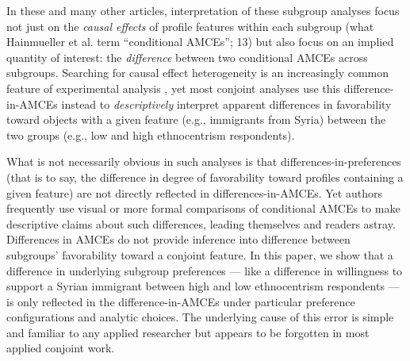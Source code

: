 \documentclass[a4paper,12pt]{article}\usepackage[]{graphicx}\usepackage[]{color}
\begin{document}
In these and many other articles, interpretation of these subgroup analyses focus not just on the \textit{causal effects} of profile features within each subgroup (what Hainmueller et al. term ``conditional AMCEs''; 13) but also focus on an implied quantity of interest: the \textit{difference} between two conditional AMCEs across subgroups. Searching for causal effect heterogeneity is an increasingly common feature of experimental analysis \citep{GreenKern2012, RatkovicTingley2017, GrimmerMessingWestwood2017}, yet most conjoint analyses use this difference-in-AMCEs instead to \textit{descriptively} interpret apparent differences in favorability toward objects with a given feature (e.g., immigrants from Syria) between the two groups (e.g., low and high ethnocentrism respondents).

What is not necessarily obvious in such analyses is that differences-in-preferences (that is to say, the difference in degree of favorability toward profiles containing a given feature) are not directly reflected in differences-in-AMCEs. Yet authors frequently use visual or more formal comparisons of conditional AMCEs to make descriptive claims about such differences, leading themselves and readers astray. Differences in AMCEs do not provide inference into difference between subgroups' favorability toward a conjoint feature. In this paper, we show that a difference in underlying subgroup preferences --- like a difference in willingness to support a Syrian immigrant between high and low ethnocentrism respondents --- is only reflected in the difference-in-AMCEs under particular preference configurations and analytic choices. The underlying cause of this error is simple and familiar to any applied researcher but appears to be forgotten in most applied conjoint work.
\end{document}
